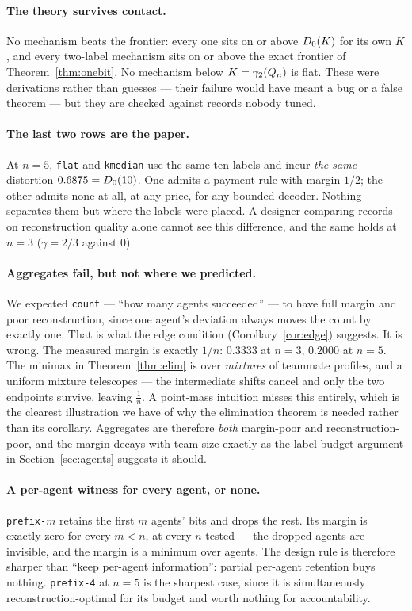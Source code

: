 \paragraph{The theory survives contact.}
No mechanism beats the frontier: every one sits on or above $D_0(K)$ for its
own $K$, and every two-label mechanism sits on or above the exact frontier of
Theorem~\ref{thm:onebit}. No mechanism below $K = \gamma_2(Q_n)$ is flat. These
were derivations rather than guesses --- their failure would have meant a bug or
a false theorem --- but they are checked against records nobody tuned.

\paragraph{The last two rows are the paper.}
At $n = 5$, \texttt{flat} and \texttt{kmedian} use the same ten labels and incur
\emph{the same} distortion $0.6875 = D_0(10)$. One admits a payment rule with
margin $1/2$; the other admits none at all, at any price, for any bounded
decoder. Nothing separates them but where the labels were placed. A designer
comparing records on reconstruction quality alone cannot see this difference, and
the same holds at $n = 3$ ($\gamma = 2/3$ against $0$).

\paragraph{Aggregates fail, but not where we predicted.}
We expected \texttt{count} --- ``how many agents succeeded'' --- to have full
margin and poor reconstruction, since one agent's deviation always moves the
count by exactly one. That is what the edge condition
(Corollary~\ref{cor:edge}) suggests. It is wrong. The measured margin is exactly
$1/n$: $0.3333$ at $n=3$, $0.2000$ at $n=5$. The minimax in
Theorem~\ref{thm:elim} is over \emph{mixtures} of teammate profiles, and a
uniform mixture telescopes --- the intermediate shifts cancel and only the two
endpoints survive, leaving $\tfrac{1}{n}$. A point-mass intuition misses this
entirely, which is the clearest illustration we have of why the elimination
theorem is needed rather than its corollary. Aggregates are therefore
\emph{both} margin-poor and reconstruction-poor, and the margin decays with team
size exactly as the label budget argument in Section~\ref{sec:agents} suggests it
should.

\paragraph{A per-agent witness for every agent, or none.}
\texttt{prefix-$m$} retains the first $m$ agents' bits and drops the rest. Its
margin is exactly zero for every $m < n$, at every $n$ tested --- the dropped
agents are invisible, and the margin is a minimum over agents. The design rule is
therefore sharper than ``keep per-agent information'': partial per-agent
retention buys nothing. \texttt{prefix-4} at $n=5$ is the sharpest case, since it
is simultaneously reconstruction-optimal for its budget and worth nothing for
accountability.

